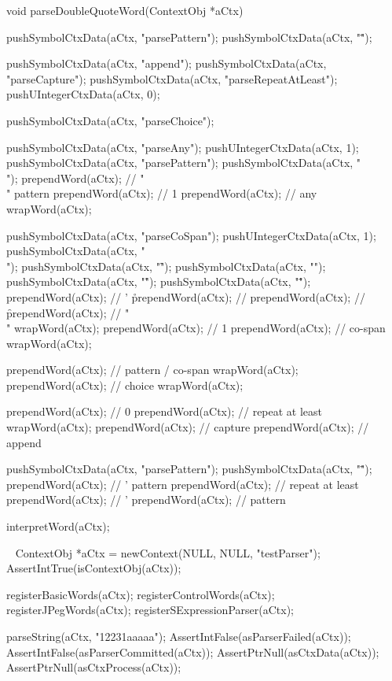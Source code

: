 \startCCode
void parseDoubleQuoteWord(ContextObj *aCtx) {

  pushSymbolCtxData(aCtx, "parsePattern");
  pushSymbolCtxData(aCtx, "\"");

  pushSymbolCtxData(aCtx, "append");
  pushSymbolCtxData(aCtx, "parseCapture");
  pushSymbolCtxData(aCtx, "parseRepeatAtLeast");
  pushUIntegerCtxData(aCtx, 0);

  pushSymbolCtxData(aCtx, "parseChoice");

  pushSymbolCtxData(aCtx, "parseAny");
  pushUIntegerCtxData(aCtx, 1);
  pushSymbolCtxData(aCtx, "parsePattern");
  pushSymbolCtxData(aCtx, "\\");
  prependWord(aCtx);  // "\\" pattern
  prependWord(aCtx);  // 1
  prependWord(aCtx);  // any
  wrapWord(aCtx);

  pushSymbolCtxData(aCtx, "parseCoSpan");
  pushUIntegerCtxData(aCtx, 1);
  pushSymbolCtxData(aCtx, "\\");
  pushSymbolCtxData(aCtx, "\f");
  pushSymbolCtxData(aCtx, "\n");
  pushSymbolCtxData(aCtx, "\r");
  pushSymbolCtxData(aCtx, "\"");
  prependWord(aCtx);  // ' \r
  prependWord(aCtx);  // \n
  prependWord(aCtx);  // \f
  prependWord(aCtx);  // "\\"
  wrapWord(aCtx);
  prependWord(aCtx);  // 1
  prependWord(aCtx);  // co-span
  wrapWord(aCtx);
  
  prependWord(aCtx);  // pattern / co-span
  wrapWord(aCtx);
  prependWord(aCtx);  // choice
  wrapWord(aCtx);
  
  prependWord(aCtx);  // 0
  prependWord(aCtx);  // repeat at least
  wrapWord(aCtx);
  prependWord(aCtx);  // capture
  prependWord(aCtx);  // append
  
  pushSymbolCtxData(aCtx, "parsePattern");
  pushSymbolCtxData(aCtx, "\"");
  prependWord(aCtx);  // ' pattern
  prependWord(aCtx);  // repeat at least
  prependWord(aCtx);  // '
  prependWord(aCtx);  // pattern

  interpretWord(aCtx);
}
\stopCCode

\CTestsSuiteSetup\
\startCTest
  ContextObj *aCtx = newContext(NULL, NULL, "testParser");
  AssertIntTrue(isContextObj(aCtx));
  
  registerBasicWords(aCtx);
  registerControlWords(aCtx);
  registerJPegWords(aCtx);
  registerSExpressionParser(aCtx);
\stopCTest

\startCTest
  parseString(aCtx, "12231aaaaa");
  AssertIntFalse(asParserFailed(aCtx));
  AssertIntFalse(asParserCommitted(aCtx));
  AssertPtrNull(asCtxData(aCtx));
  AssertPtrNull(asCtxProcess(aCtx));

